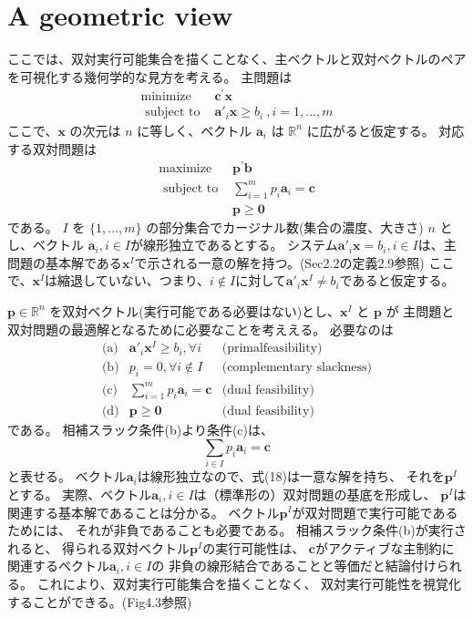 \documentclass{jsarticle}
\begin{document}
\section*{A geometric view}
ここでは、双対実行可能集合を描くことなく、主ベクトルと双対ベクトルのペアを可視化する幾何学的な見方を考える。
主問題は
\begin{equation}
  \begin{array}{cc}
  \operatorname{minimize} & \mathbf{c}^{\prime} \mathbf{x} \\
  \text { subject to } & \mathbf{a}'_i \mathbf{x}\geq b_i\:,i=1,\dots,m 
  \end{array}
\end{equation}
ここで、$\bm{x}$ の次元は $n$ に等しく、ベクトル $\bm{a}_i$ は $\mathbb{R}^n$ に広がると仮定する。
対応する双対問題は
\begin{equation}
  \begin{array}{rr}
  \operatorname{maximize} & \mathbf{p}^{\prime} \mathbf{b} \\
  \text { subject to } & \sum^m_{i=1}p_i\bm{a}_i=\bm{c}\\
  & \mathbf{p} \geq \mathbf{0}
  \end{array}
\end{equation}
である。
$I$ を $\{1,\dots ,m\}$ の部分集合でカージナル数(集合の濃度、大きさ) $n$ とし、ベクトル $\bm{a}_i, i\in I$が線形独立であるとする。
システム$\bm{a}'_i\bm{x} = b_i,i\in I$は、主問題の基本解である$\bm{x}^I$で示される一意の解を持つ。(Sec2.2の定義2.9参照)
ここで、$\bm{x}^I$は縮退していない、つまり、$i\notin I$に対して$\bm{a}'_i\bm{x}^I\neq b_i$であると仮定する。

$\bm{p}\in \mathbb{R}^n$ を双対ベクトル(実行可能である必要はない)とし、$\bm{x}^I$ と $\bm{p}$ が
主問題と双対問題の最適解となるために必要なことを考ええる。
必要なのは
\begin{equation*}
\begin{array}{ccc}
  \text{(a)} & \bm{a}'_i\bm{x}^I \geq b_i , \forall i & \text{(primalfeasibility)}\\
  \text{(b)} & p_i=0, \forall i \notin I & \text{(complementary slackness)}\\
  \text{(c)} & \sum^m_{i=1}p_i\bm{a}_i=\bm{c} & \text{(dual feasibility)}\\
  \text{(d)} & \bm{p} \geq \bm{0} & \text{(dual feasibility)}
\end{array}
\end{equation*}
である。
相補スラック条件(b)より条件(c)は、
\begin{equation}
  \sum_{i\in I}p_i\bm{a}_i=\bm{c}
\end{equation}
と表せる。
ベクトル$\bm{a}_i$は線形独立なので、式(18)は一意な解を持ち、
それを$\bm{p}^I$とする。
実際、ベクトル$\bm{a}_i, i\in I$は（標準形の）双対問題の基底を形成し、
$\bm{p}^I$は関連する基本解であることは分かる。
ベクトル$\bm{p}^I$が双対問題で実行可能であるためには、
それが非負であることも必要である。
相補スラック条件(b)が実行されると、
得られる双対ベクトル$\bm{p}^I$の実行可能性は、
$\bm{c}$がアクティブな主制約に関連するベクトル$\bm{a}_i,i \in I$の
非負の線形結合であることと等価だと結論付けられる。
これにより、双対実行可能集合を描くことなく、
双対実行可能性を視覚化することができる。(Fig4.3参照)
\end{document}
